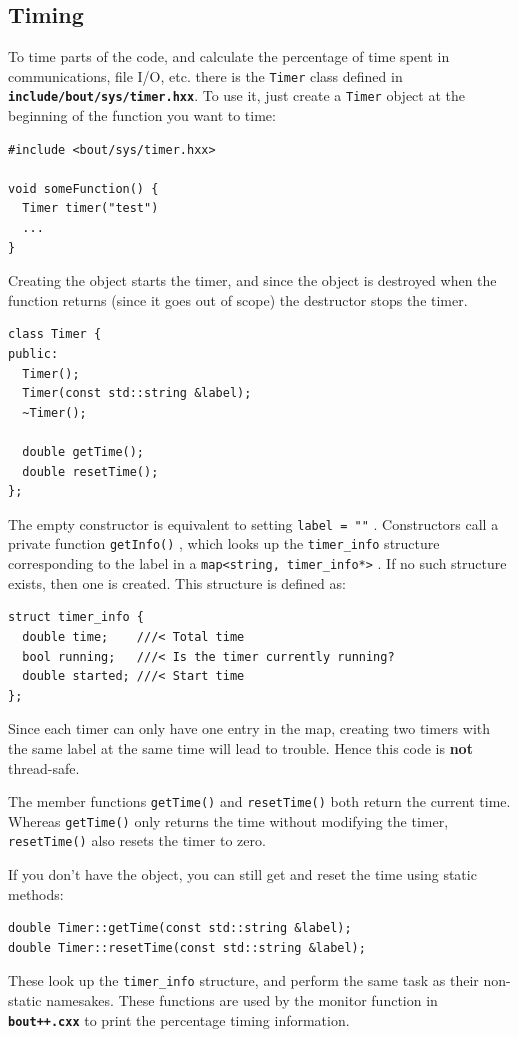 \documentclass[12pt]{article}
\newcommand{\file}[1]{\texttt{\bf #1}}
\begin{document}
\subsection{Timing}
%
\label{sec:timerclass}
%
%
To time parts of the code, and calculate the percentage of time spent in
communications, file I/O, etc. there is the
%
\lstinline!Timer!
%
 class defined in \file{include/bout/sys/timer.hxx}. To use it, just create a
%
\lstinline!Timer!
%
object at the beginning of the function you want to time:
%
\begin{lstlisting}
#include <bout/sys/timer.hxx>

void someFunction() {
  Timer timer("test")
  ...
}
\end{lstlisting}
%
Creating the object starts the timer, and since the object is destroyed when
the function returns (since it goes out of scope) the destructor stops the
timer.
%
\begin{lstlisting}
class Timer {
public:
  Timer();
  Timer(const std::string &label);
  ~Timer();

  double getTime();
  double resetTime();
};
\end{lstlisting}
%
The empty constructor is equivalent to setting
%
\lstinline!label = ""!
%
.  Constructors call a private function
%
\lstinline!getInfo()!
%
, which looks up the
%
\lstinline!timer_info!
%
 structure corresponding to the label in a
%
\lstinline!map<string, timer_info*>!
%
. If no such structure exists, then one is created. This structure is defined
as:
%
\begin{lstlisting}
struct timer_info {
  double time;    ///< Total time
  bool running;   ///< Is the timer currently running?
  double started; ///< Start time
};
\end{lstlisting}
%
Since each timer can only have one entry in the map, creating two timers with
the same label at the same time will lead to trouble.  Hence this code is {\bf
not} thread-safe.

The member functions
%
\lstinline!getTime()! and \lstinline!resetTime()!
%
both return the current time. Whereas
%
\lstinline!getTime()!
%
 only returns the time without modifying the timer,
%
\lstinline!resetTime()!
%
 also resets the timer to zero.

If you don't have the object, you can still get and reset the time using static
methods:
%
\begin{lstlisting}
double Timer::getTime(const std::string &label);
double Timer::resetTime(const std::string &label);
\end{lstlisting}
%
These look up the
%
\lstinline!timer_info!
%
 structure, and perform the same task as their non-static namesakes. These
 functions are used by the monitor function in \file{bout++.cxx} to print the
 percentage timing information.
\end{document}
